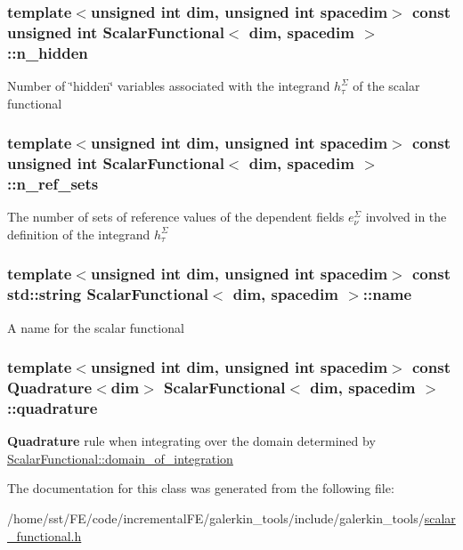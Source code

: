 \subsubsection[{\texorpdfstring{n\+\_\+hidden}{n_hidden}}]{\setlength{\rightskip}{0pt plus 5cm}template$<$unsigned int dim, unsigned int spacedim$>$ const unsigned int {\bf Scalar\+Functional}$<$ dim, spacedim $>$\+::n\+\_\+hidden}\hypertarget{class_scalar_functional_a8b1617930242870f22eef5e306cb717f}{}\label{class_scalar_functional_a8b1617930242870f22eef5e306cb717f}
Number of \char`\"{}hidden\char`\"{} variables associated with the integrand $h^\Sigma_\tau$ of the scalar functional 
\subsubsection[{\texorpdfstring{n\+\_\+ref\+\_\+sets}{n_ref_sets}}]{\setlength{\rightskip}{0pt plus 5cm}template$<$unsigned int dim, unsigned int spacedim$>$ const unsigned int {\bf Scalar\+Functional}$<$ dim, spacedim $>$\+::n\+\_\+ref\+\_\+sets}\hypertarget{class_scalar_functional_a7e12423f4b29e9e0aaa0f7f9c2d1c0eb}{}\label{class_scalar_functional_a7e12423f4b29e9e0aaa0f7f9c2d1c0eb}
The number of sets of reference values of the dependent fields $e^\Sigma_\nu$ involved in the definition of the integrand $h^\Sigma_\tau$ 
\subsubsection[{\texorpdfstring{name}{name}}]{\setlength{\rightskip}{0pt plus 5cm}template$<$unsigned int dim, unsigned int spacedim$>$ const std\+::string {\bf Scalar\+Functional}$<$ dim, spacedim $>$\+::name}\hypertarget{class_scalar_functional_a4d184688053b3443d10e228e4a8eba60}{}\label{class_scalar_functional_a4d184688053b3443d10e228e4a8eba60}
A name for the scalar functional 
\subsubsection[{\texorpdfstring{quadrature}{quadrature}}]{\setlength{\rightskip}{0pt plus 5cm}template$<$unsigned int dim, unsigned int spacedim$>$ const {\bf Quadrature}$<$dim$>$ {\bf Scalar\+Functional}$<$ dim, spacedim $>$\+::quadrature}\hypertarget{class_scalar_functional_adea9ff214aeb2a1d8c3712a9d2433883}{}\label{class_scalar_functional_adea9ff214aeb2a1d8c3712a9d2433883}
{\bf Quadrature} rule when integrating over the domain determined by \hyperlink{class_scalar_functional_ae3b6dd6934e1cd55fcc55cf344179407}{Scalar\+Functional\+::domain\+\_\+of\+\_\+integration} 

The documentation for this class was generated from the following file\+:\begin{DoxyCompactItemize}
\item 
/home/sst/\+F\+E/code/incremental\+F\+E/galerkin\+\_\+tools/include/galerkin\+\_\+tools/\hyperlink{scalar__functional_8h}{scalar\+\_\+functional.\+h}\end{DoxyCompactItemize}
